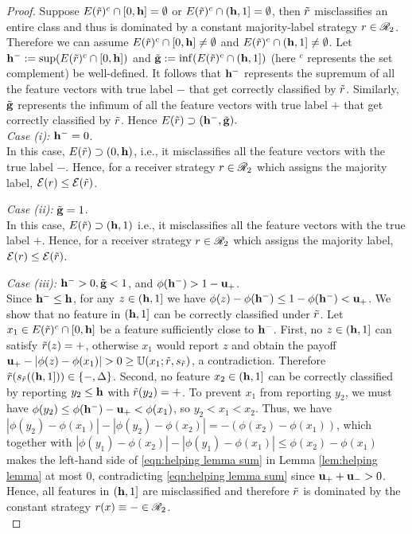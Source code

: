 \begin{proof}\label{proof:Deterministic domination of a family of strategies}
    Suppose $E(\tilde{r})^c \cap [0, \mathbf{h}] = \emptyset$ or $E(\tilde{r})^c \cap (\mathbf{h}, 1] = \emptyset$, then $\tilde{r}$ misclassifies an entire class and thus is dominated by a constant majority-label strategy $r \in \mathscr{R}_2$. Therefore we can assume $E(\tilde{r})^c \cap [0, \mathbf{h}] \neq \emptyset$ and $E(\tilde{r})^c \cap (\mathbf{h}, 1] \neq \emptyset$. Let $\mathbf{h^{-}} := \sup (E(\tilde{r})^c \cap [0,\mathbf{h}])$ and $\tilde{\mathbf{g}} := \inf(E(\tilde{r})^c \cap (\mathbf{h},1])$ (here $^c$ represents the set complement) be well-defined. It follows that $\mathbf{h^{-}}$ represents the supremum of all the feature vectors with true label $\minus$ that get correctly classified by $\tilde{r}$. Similarly, $\tilde{\mathbf{g}}$ represents the infimum of all the feature vectors with true label $\plus$ that get correctly classified by $\tilde{r}$. Hence $E(\tilde{r}) \supset (\mathbf{h^{-}},\tilde{\mathbf{g}}).$\\
	\noindent \textit{Case (i): }\label{lem:Deterministic domination of a family of strategies:a}{$\mathbf{h^{-}} = 0$.}\\
		In this case, $E(\tilde{r}) \supset (0,\mathbf{h})$, i.e., it misclassifies all the feature vectors with the true label $\minus$. Hence, for a receiver strategy $r \in \mathscr{R}_2$ which assigns the majority label, $\mathcal{E}(r) \leq \mathcal{E}(\tilde{r})$.


\noindent \textit{Case (ii): }\label{lem:Deterministic domination of a family of strategies:b}{$\tilde{\mathbf{g}} = 1$.}\\
		In this case, $E(\tilde{r}) \supset (\mathbf{h},1)$ i.e., it misclassifies all the feature vectors with the true label $\plus$. Hence, for a receiver strategy $r \in \mathscr{R}_2$ which assigns the majority label, $\mathcal{E}(r) \leq \mathcal{E}(\tilde{r})$.


\noindent \textit{Case (iii): }{$\mathbf{h^{-}} > 0, \tilde{\mathbf{g}} < 1$, and $\phi(\mathbf{h^{-}}) > 1 - \mathbf{u_+}$.}\\
		Since $\mathbf{h^{-}} \le \mathbf{h}$, for any $z \in (\mathbf{h}, 1]$ we have $\phi(z) - \phi(\mathbf{h^{-}}) \le 1 - \phi(\mathbf{h^{-}}) < \mathbf{u_+}$. We show that no feature in $(\mathbf{h}, 1]$ can be correctly classified under $\tilde{r}$. Let $x_1 \in E(\tilde{r})^c \cap [0,\mathbf{h}]$ be a feature sufficiently close to $\mathbf{h^{-}}$.
		First, no $z \in (\mathbf{h}, 1]$ can satisfy $\tilde{r}(z) = \mathbf{+}$, otherwise $x_1$ would report $z$ and obtain the payoff $\mathbf{u_+} - |\phi(z) - \phi(x_1)| > 0 \ge \mathbb{U}(x_1; \tilde{r}, s_{\tilde{r}})$, a contradiction. Therefore $\tilde{r}(s_{\tilde{r}}((\mathbf{h},1])) \in \{\mathbf{-}, \Delta\}$. Second, no feature $x_2 \in (\mathbf{h}, 1]$ can be correctly classified by reporting $y_2 \le \mathbf{h}$ with $\tilde{r}(y_2) = \mathbf{+}$. To prevent $x_1$ from reporting $y_2$, we must have $\phi(y_2) \le \phi(\mathbf{h^{-}}) - \mathbf{u_+} < \phi(x_1)$, so $y_2 < x_1 < x_2$. Thus, we have $|\phi(y_2) - \phi(x_1)| - |\phi(y_2) - \phi(x_2)| = -(\phi(x_2) - \phi(x_1))$, which together with $|\phi(y_1) - \phi(x_2)| - |\phi(y_1) - \phi(x_1)| \le \phi(x_2) - \phi(x_1)$ makes the left-hand side of \eqref{eqn:helping lemma sum} in Lemma \ref{lem:helping lemma} at most $0$, contradicting \eqref{eqn:helping lemma sum} since $\mathbf{u_+} + \mathbf{u_-} > 0$. Hence, all features in $(\mathbf{h}, 1]$  are misclassified and therefore $\tilde{r}$ is dominated by the constant strategy $r(x) \equiv \mathbf{-} \in \mathscr{R}_2$.\\
	

\end{proof}
